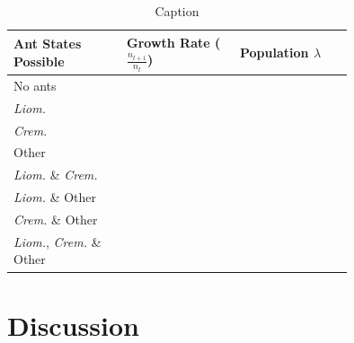 \documentclass[12pt,a4paper]{article}
\begin{document}
	\begin{table}[]
	    \centering
	    \begin{tabular}{|p{0.25 \linewidth}   |p{0.25 \linewidth}|p{0.25 \linewidth}|}
	    \hline
	        \textbf{Ant States Possible} & \textbf{Growth Rate ($\frac{n_{t+1}}{n_t}$)} & \textbf{Population $\lambda$}\\
	        \hline
	        No ants & &\\
	        \hline
	        \textit{Liom.} & & \\
	        \hline
	        \textit{Crem.}  & & \\
	        \hline
	        Other & & \\
	        \hline
	        \textit{Liom.} \& \textit{Crem.} & & \\
	        \hline
	        \textit{Liom.} \& Other & & \\
	        \hline 
	        \textit{Crem.} \& Other & & \\
	        \hline
	        \textit{Liom.}, \textit{Crem.} \& Other & & \\
	        \hline
	    \end{tabular}
	    \caption{Caption}
	    \label{tab:table_sims}
	\end{table}
	
	\section*{Discussion}
	
\end{document}

